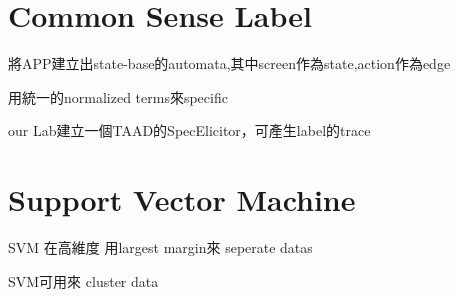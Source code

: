 \clearpage

\section{Common Sense Label}

將APP建立出state-base的automata,其中screen作為state,action作為edge

用統一的normalized terms來specific

our Lab建立一個TAAD的SpecElicitor，可產生label的trace


\section{Support Vector Machine}

SVM 在高維度 用largest margin來 seperate datas 

SVM可用來 cluster data
